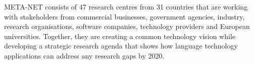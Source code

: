 \begin{Parallel}[c]{78mm}{78mm}
{META-NET consists of 47 research centres from 31 countries that are working
with stakeholders from commercial businesses, government agencies, industry,
research organisations, software companies, technology providers and European
universities. Together, they are creating a common technology vision while
developing a strategic research agenda that shows how language technology
applications can address any research gaps by 2020.
}

\ParallelPar
\end{Parallel}
\cleardoublepage


\renewcommand\contentsname{}
\tableofcontents


\cleardoublepage


\setcounter{page}{1}
\pagestyle{scrheadings}






